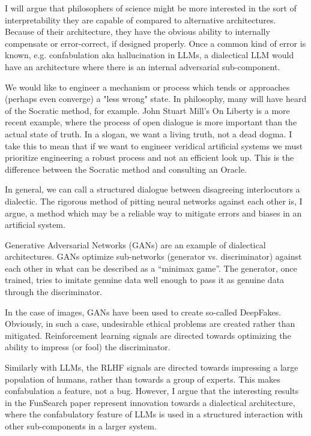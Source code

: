 \documentclass[11pt, oneside]{article}   	%
\begin{document}
I will argue that philosophers of science might be more interested in the sort of interpretability they are capable of compared to alternative architectures.  Because of their architecture, they have the obvious ability to internally compensate or error-correct, if designed properly.  Once a common kind of error is known, e.g. confabulation aka hallucination in LLMs, a dialectical LLM would have an architecture where there is an internal adversarial sub-component.







We would like to engineer a mechanism or process which tends or approaches (perhaps even converge) a "less wrong" state.  In philosophy, many will have heard of the Socratic method, for example.  John Stuart Mill's On Liberty is a more recent example, where the process of open dialogue is more important than the actual state of truth.  In a slogan, we want a living truth, not a dead dogma.  I take this to mean that if we want to engineer veridical artificial systems we must prioritize engineering a robust process and not an efficient look up.  This is the difference between the Socratic method and consulting an Oracle.

In general, we can call a structured dialogue between disagreeing interlocutors a dialectic.  The rigorous method of pitting neural networks against each other is, I argue, a method which may be a reliable way to mitigate errors and biases in an artificial system.  

Generative Adversarial Networks (GANs) are an example of dialectical architectures.  GANs optimize sub-networks (generator vs. discriminator) against each other in what can be described as a ``minimax game''.  \citep{GANS2014}  The generator, once trained, tries to imitate genuine data well enough to pass it as genuine data through the discriminator. 

In the case of images, GANs have been used to create so-called DeepFakes.  Obviously, in such a case, undesirable ethical problems are created rather than mitigated.  Reinforcement learning signals are directed towards optimizing the ability to impress (or fool) the discriminator.

Similarly with LLMs, the RLHF signals are directed towards impressing a large population of humans, rather than towards a group of experts.  This makes confabulation a feature, not a bug.  However, I argue that the interesting results in the FunSearch paper represent innovation towards a dialectical architecture, where the confabulatory feature of LLMs is used in a structured interaction with other sub-components in a larger system.
\end{document}
